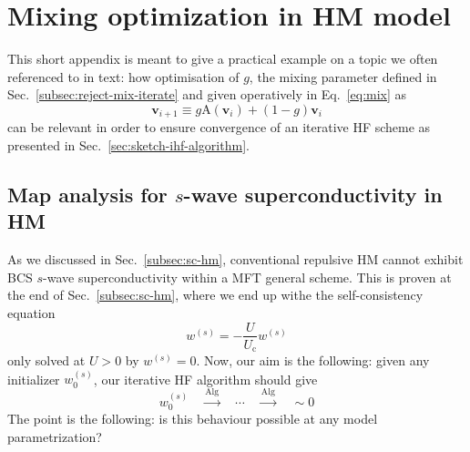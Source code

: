 \chapter{Mixing optimization in HM model}\label{app:sc-g-opt}

This short appendix is meant to give a practical example on a topic we often referenced to in text: how optimisation of $g$, the mixing parameter defined in Sec.~\ref{subsec:reject-mix-iterate} and given operatively in  Eq.~\eqref{eq:mix} as
\[
	\mathbf{v}_{i+1} \equiv g \mathrm{A} \left( \mathbf{v}_{i} \right) + (1-g) \mathbf{v}_{i}
\]
can be relevant in order to ensure convergence of an iterative HF scheme as presented in Sec.~\ref{sec:sketch-ihf-algorithm}.

\section{Map analysis for $s$-wave superconductivity in HM}

As we discussed in Sec.~\ref{subsec:sc-hm}, conventional repulsive HM cannot exhibit BCS $s$-wave superconductivity within a MFT general scheme. This is proven at the end of Sec.~\ref{subsec:sc-hm}, where we end up withe the self-consistency equation
\begin{equation}\label{appeq:sc-self-consistency}
	w^{(s)} = -\frac{U}{U_\mathrm{c}} w^{(s)}
\end{equation}
only solved at $U>0$ by $w^{(s)}=0$. Now, our aim is the following: given any initializer $w^{(s)}_0$, our iterative HF algorithm should give
\[
	w^{(s)}_0
	\quad\stackrel{\mathrm{Alg}}{\to}\quad
	\cdots 
	\quad\stackrel{\mathrm{Alg}}{\to}\quad 
	\sim 0 
\]
The point is the following: is this behaviour possible at any model parametrization?

